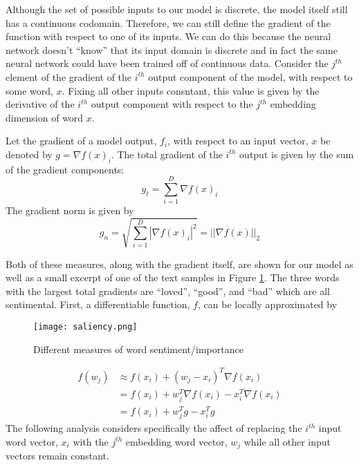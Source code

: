 Although the set of possible inputs to our model is discrete, the model itself still has a continuous codomain.  Therefore, we can still define the gradient of the function with respect to one of its inputs.  We can do this because the neural network doesn't ``know'' that its input domain is discrete and in fact the same neural network could have been trained off of continuous data.  Consider the $j^{th}$ element of the gradient of the $i^{th}$ output component of the model, with respect to some word, $x$.  Fixing all other inputs consntant, this value is given by the derivative of the $i^{th}$ output component with respect to the $j^{th}$ embedding dimension of word $x$.

\noindent
\begin{definition}
Let the gradient of a model output, $f_i$, with respect to an input vector, $x$ be denoted by $g=\nabla f(x)_i$.  The total gradient of the $i^{th}$ output is given by the sum of the gradient components:
\begin{equation}
g_t = \sum_{i=1}^D \nabla f(x)_i
\end{equation}
The gradient norm is given by 
\begin{equation}
g_n = \sqrt{\sum_{i=1}^D |\nabla f(x)_i|^2} = ||\nabla f(x)||_2
\end{equation}
\end{definition}

Both of these measures, along with the gradient itself, are shown for our model as well as a small excerpt of one of the text samples in Figure \ref{fig:saliency}.  The three words with the largest total gradients are ``loved'', ``good'', and ``bad'' which are all sentimental.  First, a differentiable function, $f$, can be locally approximated by

\begin{figure}
    \centering
    \texttt{[image: saliency.png]}
    \caption{Different measures of word sentiment/importance}
    \label{fig:saliency}
\end{figure}

\begin{align}
f(w_j) &\approx f(x_i) + (w_j-x_i)^T\nabla f(x_i) \\
     &= f(x_i) + w_j^T\nabla f(x_i) - x_i^T\nabla f(x_i) \\
     &= f(x_i) + w_j^Tg - x_i^Tg \label{approx}
\end{align}
The following analysis considers specifically the affect of replacing the $i^{th}$ input word vector, $x_i$ with the $j^{th}$ embedding word vector, $w_j$ while all other input vectors remain constant.

